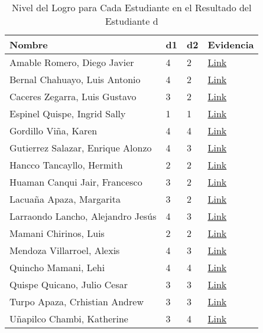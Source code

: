 \begin{landscape}
\begin{table}[h]
\centering
\begin{tabular}{L{6cm}|C{1cm}|C{1cm}|C{2cm}}
\hline
\textbf{Nombre} & 
\textbf{d1} & 
\textbf{d2} & 
\textbf{Evidencia} 
\\ \hline
Amable Romero, Diego Javier &
4 &
2 &
\href{https://drive.google.com/open?id=1RGE-0KmemYyM1_d2kqPFSByuEEYTf70C}{Link}
\\ \hline
Bernal Chahuayo, Luis Antonio &
4 &
2 &
\href{https://drive.google.com/open?id=1FeRY8FPwENPs6JGo3LrUYZigr4FfQQH4}{Link}
\\ \hline
Caceres Zegarra, Luis Gustavo &
3 &
2 &
\href{https://drive.google.com/open?id=1aRhn2lBo3sZXlTMA4sh9wJ5r5g2bXE8T}{Link}
\\ \hline
Espinel Quispe, Ingrid Sally &
1 &
1 &
\href{https://drive.google.com/open?id=135na5wEvQ_LrngLGUhVwp92BpkZ2PblH}{Link}
\\ \hline
Gordillo Viña, Karen &
4 &
4 &
\href{https://drive.google.com/open?id=12-LqWuAXj5IB53-Me7gi4mJz6In7qewI}{Link}
\\ \hline
Gutierrez Salazar, Enrique Alonzo &
4 &
3 &
\href{https://drive.google.com/open?id=10fti0Nvn_GhppfJQ0cGxxPrEwGgbgulw}{Link}
\\ \hline
Hancco Tancayllo, Hermith &
2 &
2 &
\href{https://drive.google.com/open?id=15XyNJkvHo4XuC1ylerS8IQey5eImNxRR}{Link}
\\ \hline
Huaman Canqui Jair, Francesco &
3 &
2 &
\href{https://drive.google.com/open?id=1KHvPDBSUBZqywpxbN_niUf8PdkRjzBoC}{Link}
\\ \hline
Lacuaña Apaza, Margarita &
3 &
2 &
\href{https://drive.google.com/open?id=1OZAFwkOkPnFwLvVwAAH-jvAhziwBx09o}{Link}
\\ \hline
Larraondo Lancho, Alejandro Jesús &
4 &
3 &
\href{https://drive.google.com/open?id=1qjRtWRIrA7fcinCeWOX74rG9vonaawIF}{Link}
\\ \hline
Mamani Chirinos, Luis &
2 &
2 &
\href{https://drive.google.com/open?id=1JrGsIkJzS_lwTkOaSZdIipVaRmakLodP}{Link}
\\ \hline
Mendoza Villarroel, Alexis &
4 &
3 &
\href{https://drive.google.com/open?id=1xQ0p9bxbJRba3aqW5BiKMy3jFEyogEPM}{Link}
\\ \hline
Quincho Mamani, Lehi &
4 &
4 &
\href{https://drive.google.com/open?id=1X4sgTvGoHOD-xrGULO0eLx6MiX9UB26f}{Link}
\\ \hline
Quispe Quicano, Julio Cesar &
3 &
3 &
\href{https://drive.google.com/open?id=1498VuZAYY9B6AScuvHA5EMFrCAxscPer}{Link}
\\ \hline
Turpo Apaza, Crhistian Andrew &
3 &
3 &
\href{https://drive.google.com/open?id=14HnFWBEkh2y6LEVVtxKpaJqsddbscORE}{Link}
\\ \hline
Uñapilco Chambi, Katherine &
3 &
4 &
\href{https://drive.google.com/open?id=1fXM-Ufvhy0M0FVDEkZ8dclLG2OK0P8ga}{Link}
\\ \hline
\end{tabular}
\caption{Nivel del Logro para Cada Estudiante en el Resultado del Estudiante \lbrack d\rbrack}
\label{tab:nivel_estudiante_d} 
\end{table}


\end{landscape}
